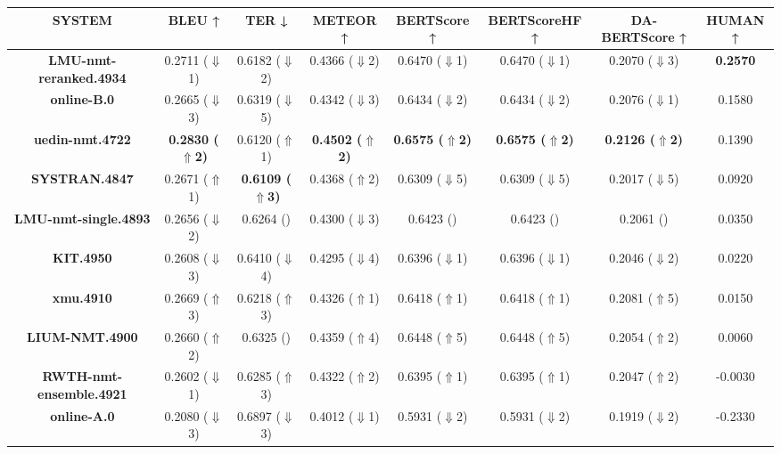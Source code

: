 \begin{table*}[ht]
\centering
\tiny
\begin{tabular}{cccccccc}
\toprule
\textbf{SYSTEM} & \textbf{BLEU ↑} & \textbf{TER ↓} & \textbf{METEOR ↑} & \textbf{BERTScore ↑} & \textbf{BERTScoreHF ↑} & \textbf{DA-BERTScore ↑} & \textbf{HUMAN ↑} \\
\midrule
\textbf{LMU-nmt-reranked.4934} & {0.2711 ($\Downarrow$1)} & {0.6182 ($\Downarrow$2)} & {0.4366 ($\Downarrow$2)} & {0.6470 ($\Downarrow$1)} & {0.6470 ($\Downarrow$1)} & {0.2070 ($\Downarrow$3)} & \textbf{0.2570} \\
\textbf{online-B.0} & {0.2665 ($\Downarrow$3)} & {0.6319 ($\Downarrow$5)} & {0.4342 ($\Downarrow$3)} & {0.6434 ($\Downarrow$2)} & {0.6434 ($\Downarrow$2)} & {0.2076 ($\Downarrow$1)} & {0.1580} \\
\textbf{uedin-nmt.4722} & \textbf{0.2830 ($\Uparrow$2)} & {0.6120 ($\Uparrow$1)} & \textbf{0.4502 ($\Uparrow$2)} & \textbf{0.6575 ($\Uparrow$2)} & \textbf{0.6575 ($\Uparrow$2)} & \textbf{0.2126 ($\Uparrow$2)} & {0.1390} \\
\textbf{SYSTRAN.4847} & {0.2671 ($\Uparrow$1)} & \textbf{0.6109 ($\Uparrow$3)} & {0.4368 ($\Uparrow$2)} & {0.6309 ($\Downarrow$5)} & {0.6309 ($\Downarrow$5)} & {0.2017 ($\Downarrow$5)} & {0.0920} \\
\textbf{LMU-nmt-single.4893} & {0.2656 ($\Downarrow$2)} & {0.6264 (\checkmark0)} & {0.4300 ($\Downarrow$3)} & {0.6423 (\checkmark0)} & {0.6423 (\checkmark0)} & {0.2061 (\checkmark0)} & {0.0350} \\
\textbf{KIT.4950} & {0.2608 ($\Downarrow$3)} & {0.6410 ($\Downarrow$4)} & {0.4295 ($\Downarrow$4)} & {0.6396 ($\Downarrow$1)} & {0.6396 ($\Downarrow$1)} & {0.2046 ($\Downarrow$2)} & {0.0220} \\
\textbf{xmu.4910} & {0.2669 ($\Uparrow$3)} & {0.6218 ($\Uparrow$3)} & {0.4326 ($\Uparrow$1)} & {0.6418 ($\Uparrow$1)} & {0.6418 ($\Uparrow$1)} & {0.2081 ($\Uparrow$5)} & {0.0150} \\
\textbf{LIUM-NMT.4900} & {0.2660 ($\Uparrow$2)} & {0.6325 (\checkmark0)} & {0.4359 ($\Uparrow$4)} & {0.6448 ($\Uparrow$5)} & {0.6448 ($\Uparrow$5)} & {0.2054 ($\Uparrow$2)} & {0.0060} \\
\textbf{RWTH-nmt-ensemble.4921} & {0.2602 ($\Downarrow$1)} & {0.6285 ($\Uparrow$3)} & {0.4322 ($\Uparrow$2)} & {0.6395 ($\Uparrow$1)} & {0.6395 ($\Uparrow$1)} & {0.2047 ($\Uparrow$2)} & {-0.0030} \\
\textbf{online-A.0} & {0.2080 ($\Downarrow$3)} & {0.6897 ($\Downarrow$3)} & {0.4012 ($\Downarrow$1)} & {0.5931 ($\Downarrow$2)} & {0.5931 ($\Downarrow$2)} & {0.1919 ($\Downarrow$2)} & {-0.2330} \\

\end{tabular}
\end{table*}
